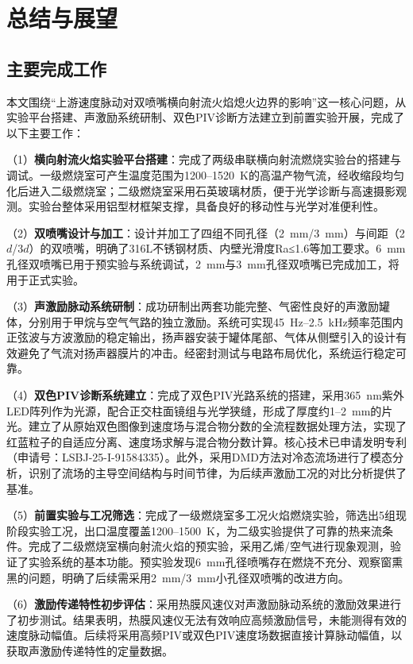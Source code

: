 
\chapter{总结与展望}

\section{主要完成工作}

本文围绕“上游速度脉动对双喷嘴横向射流火焰熄火边界的影响”这一核心问题，从实验平台搭建、声激励系统研制、双色PIV诊断方法建立到前置实验开展，完成了以下主要工作：

（1）\textbf{横向射流火焰实验平台搭建}：完成了两级串联横向射流燃烧实验台的搭建与调试。一级燃烧室可产生温度范围为1200--1520~K的高温产物气流，经收缩段均匀化后进入二级燃烧室；二级燃烧室采用石英玻璃材质，便于光学诊断与高速摄影观测。实验台整体采用铝型材框架支撑，具备良好的移动性与光学对准便利性。

（2）\textbf{双喷嘴设计与加工}：设计并加工了四组不同孔径（2~mm/3~mm）与间距（2$d$/3$d$）的双喷嘴，明确了316L不锈钢材质、内壁光滑度Ra≤1.6等加工要求。6~mm孔径双喷嘴已用于预实验与系统调试，2~mm与3~mm孔径双喷嘴已完成加工，将用于正式实验。

（3）\textbf{声激励脉动系统研制}：成功研制出两套功能完整、气密性良好的声激励罐体，分别用于甲烷与空气气路的独立激励。系统可实现45~Hz--2.5~kHz频率范围内正弦波与方波激励的稳定输出，扬声器安装于罐体尾部、气体从侧壁引入的设计有效避免了气流对扬声器膜片的冲击。经密封测试与电路布局优化，系统运行稳定可靠。

（4）\textbf{双色PIV诊断系统建立}：完成了双色PIV光路系统的搭建，采用365~nm紫外LED阵列作为光源，配合正交柱面镜组与光学狭缝，形成了厚度约1--2~mm的片光。建立了从原始双色图像到速度场与混合物分数的全流程数据处理方法，实现了红蓝粒子的自适应分离、速度场求解与混合物分数计算。核心技术已申请发明专利（申请号：LSBJ-25-I-91584335）。此外，采用DMD方法对冷态流场进行了模态分析，识别了流场的主导空间结构与时间节律，为后续声激励工况的对比分析提供了基准。

（5）\textbf{前置实验与工况筛选}：完成了一级燃烧室多工况火焰燃烧实验，筛选出5组现阶段实验工况，出口温度覆盖1200--1500~K，为二级实验提供了可靠的热来流条件。完成了二级燃烧室横向射流火焰的预实验，采用乙烯/空气进行现象观测，验证了实验系统的基本功能。预实验发现6~mm孔径喷嘴存在燃烧不充分、观察窗熏黑的问题，明确了后续需采用2~mm/3~mm小孔径双喷嘴的改进方向。

（6）\textbf{激励传递特性初步评估}：采用热膜风速仪对声激励脉动系统的激励效果进行了初步测试。结果表明，热膜风速仪无法有效响应高频激励信号，未能测得有效的速度脉动幅值。后续将采用高频PIV或双色PIV速度场数据直接计算脉动幅值，以获取声激励传递特性的定量数据。

